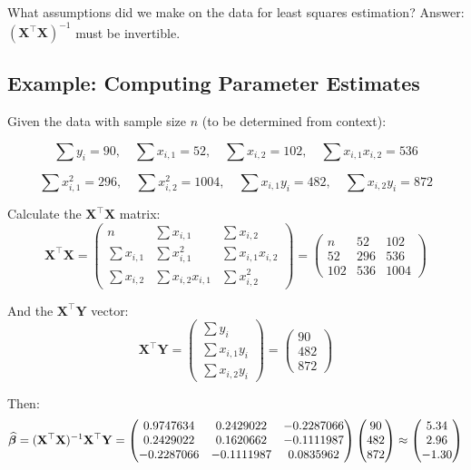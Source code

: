 \begin{caution}
What assumptions did we make on the data for least squares estimation? Answer: $(\mathbf{X}^\top \mathbf{X})^{-1}$ must be invertible.
\end{caution}

\subsection{Example: Computing Parameter Estimates}

Given the data with sample size $n$ (to be determined from context):

\[
\sum y_i = 90,\quad
\sum x_{i,1} = 52,\quad
\sum x_{i,2} = 102,\quad
\sum x_{i,1}x_{i,2} = 536
\]

\[
\sum x_{i,1}^2 = 296,\quad
\sum x_{i,2}^2 = 1004,\quad
\sum x_{i,1}y_i = 482,\quad
\sum x_{i,2}y_i = 872
\]

Calculate the $\mathbf{X}^{\top}\mathbf{X}$ matrix:
\[
\mathbf{X}^\top \mathbf{X}
=
\begin{pmatrix}
n & \sum x_{i,1} & \sum x_{i,2} \\
\sum x_{i,1} & \sum x_{i,1}^2 & \sum x_{i,1}x_{i,2} \\
\sum x_{i,2} & \sum x_{i,2}x_{i,1} & \sum x_{i,2}^2
\end{pmatrix}
=
\begin{pmatrix}
n & 52 & 102 \\
52 & 296 & 536 \\
102 & 536 & 1004
\end{pmatrix}
\]

And the $\mathbf{X}^{\top}\mathbf{Y}$ vector:
\[
\mathbf{X}^\top \mathbf{Y}
=
\begin{pmatrix}
\sum y_i \\
\sum x_{i,1}y_i \\
\sum x_{i,2}y_i
\end{pmatrix}
=
\begin{pmatrix}
90 \\
482 \\
872
\end{pmatrix}
\]

Then:
\[
\widehat{\boldsymbol{\beta}}
=
(\mathbf{X}^\top \mathbf{X})^{-1} \mathbf{X}^\top \mathbf{Y}
=
\begin{pmatrix}
0.9747634 & 0.2429022 & -0.2287066 \\
0.2429022 & 0.1620662 & -0.1111987 \\
-0.2287066 & -0.1111987 & 0.0835962
\end{pmatrix}
\begin{pmatrix}
90 \\
482 \\
872
\end{pmatrix}
\approx
\begin{pmatrix}
5.34 \\
2.96 \\
-1.30
\end{pmatrix}
\]

